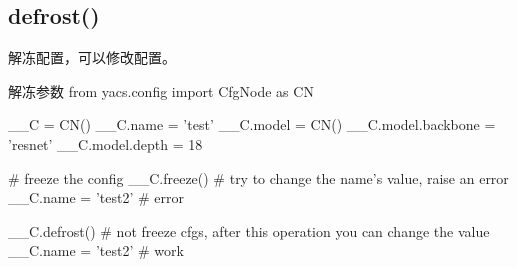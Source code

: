 \documentclass[11pt]{article}
\begin{document}
\subsection{defrost()}
解冻配置，可以修改配置。
\begin{Python}{解冻参数}
	from yacs.config import CfgNode as CN
	
	__C = CN()
	__C.name = 'test'
	__C.model = CN()
	__C.model.backbone = 'resnet'
	__C.model.depth = 18
	
	# freeze the config
	__C.freeze()
	# try to change the name's value, raise an error
	__C.name = 'test2'  # error
	
	__C.defrost() # not freeze cfgs, after this operation you can change the value
	__C.name = 'test2'  # work
\end{Python}
\end{document}

